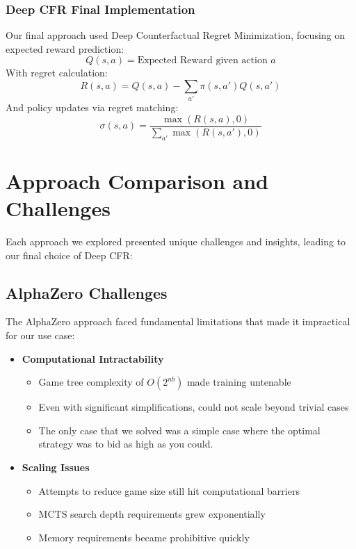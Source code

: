 \documentclass[11pt]{article}
\begin{document}
\subsubsection{Deep CFR Final Implementation}
Our final approach used Deep Counterfactual Regret Minimization, focusing on expected reward prediction:
\[
Q(s,a) = \text{Expected Reward given action } a
\]
With regret calculation:
\[
R(s,a) = Q(s,a) - \sum_{a'} \pi(s,a') Q(s,a')
\]
And policy updates via regret matching:
\[
\sigma(s,a) = \frac{\max(R(s,a), 0)}{\sum_{a'} \max(R(s,a'), 0)}
\]

\section{Approach Comparison and Challenges}
Each approach we explored presented unique challenges and insights, leading to our final choice of Deep CFR:

\subsection{AlphaZero Challenges}
The AlphaZero approach faced fundamental limitations that made it impractical for our use case:

\begin{itemize}
    \item \textbf{Computational Intractability}
    \begin{itemize}
        \item Game tree complexity of $O(2^{nb})$ made training untenable
        \item Even with significant simplifications, could not scale beyond trivial cases
        \item The only case that we solved was a simple case where the optimal strategy was to bid as high as you could.
    \end{itemize}
    
    \item \textbf{Scaling Issues}
    \begin{itemize}
        \item Attempts to reduce game size still hit computational barriers
        \item MCTS search depth requirements grew exponentially
        \item Memory requirements became prohibitive quickly
    \end{itemize}
\end{itemize}
\end{document}
